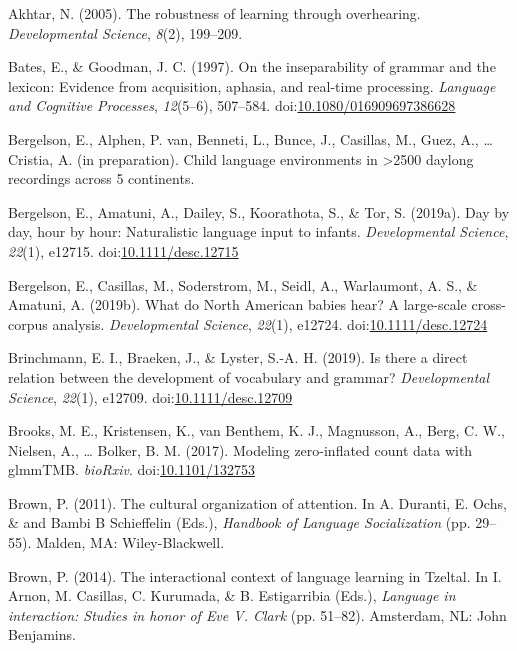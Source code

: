 \documentclass[,man,floatsintext]{apa6}
\begin{document}
\hypertarget{ref-akhtar2005robustness}{}
Akhtar, N. (2005). The robustness of learning through overhearing.
\emph{Developmental Science}, \emph{8}(2), 199--209.

\hypertarget{ref-bates1997inseparability}{}
Bates, E., \& Goodman, J. C. (1997). On the inseparability of grammar
and the lexicon: Evidence from acquisition, aphasia, and real-time
processing. \emph{Language and Cognitive Processes}, \emph{12}(5--6),
507--584.
doi:\href{https://doi.org/10.1080/016909697386628}{10.1080/016909697386628}

\hypertarget{ref-bergelsonIPbsl}{}
Bergelson, E., Alphen, P. van, Benneti, L., Bunce, J., Casillas, M.,
Guez, A., \ldots{} Cristia, A. (in preparation). Child language
environments in \textgreater{}2500 daylong recordings across 5
continents.

\hypertarget{ref-bergelson2019day}{}
Bergelson, E., Amatuni, A., Dailey, S., Koorathota, S., \& Tor, S.
(2019a). Day by day, hour by hour: Naturalistic language input to
infants. \emph{Developmental Science}, \emph{22}(1), e12715.
doi:\href{https://doi.org/10.1111/desc.12715}{10.1111/desc.12715}

\hypertarget{ref-bergelsoncasillas2019what}{}
Bergelson, E., Casillas, M., Soderstrom, M., Seidl, A., Warlaumont, A.
S., \& Amatuni, A. (2019b). What do North American babies hear? A
large-scale cross-corpus analysis. \emph{Developmental Science},
\emph{22}(1), e12724.
doi:\href{https://doi.org/10.1111/desc.12724}{10.1111/desc.12724}

\hypertarget{ref-brinchmann2019direct}{}
Brinchmann, E. I., Braeken, J., \& Lyster, S.-A. H. (2019). Is there a
direct relation between the development of vocabulary and grammar?
\emph{Developmental Science}, \emph{22}(1), e12709.
doi:\href{https://doi.org/10.1111/desc.12709}{10.1111/desc.12709}

\hypertarget{ref-brooks2017modeling}{}
Brooks, M. E., Kristensen, K., van Benthem, K. J., Magnusson, A., Berg,
C. W., Nielsen, A., \ldots{} Bolker, B. M. (2017). Modeling
zero-inflated count data with glmmTMB. \emph{bioRxiv}.
doi:\href{https://doi.org/10.1101/132753}{10.1101/132753}

\hypertarget{ref-brown2011cultural}{}
Brown, P. (2011). The cultural organization of attention. In A. Duranti,
E. Ochs, \& and Bambi B Schieffelin (Eds.), \emph{Handbook of Language
Socialization} (pp. 29--55). Malden, MA: Wiley-Blackwell.

\hypertarget{ref-brown2014interactional}{}
Brown, P. (2014). The interactional context of language learning in
Tzeltal. In I. Arnon, M. Casillas, C. Kurumada, \& B. Estigarribia
(Eds.), \emph{Language in interaction: Studies in honor of Eve V. Clark}
(pp. 51--82). Amsterdam, NL: John Benjamins.
\end{document}
